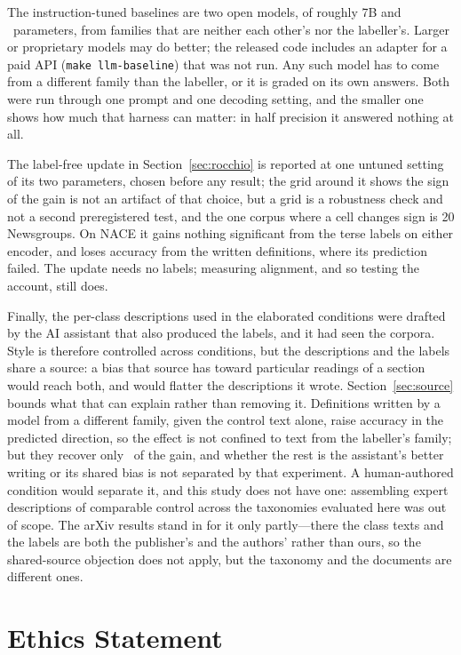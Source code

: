 \documentclass[11pt]{article}
\begin{document}
The instruction-tuned baselines are two open models, of roughly 7B and
\LLMTwoParams\ parameters, from families that are neither each other's nor the
labeller's. Larger or proprietary models may do better; the released code
includes an adapter for a paid API (\texttt{make llm-baseline}) that was not
run. Any such model has to come from a different family than the labeller, or it
is graded on its own answers. Both were run through one prompt and one decoding
setting, and the smaller one shows how much that harness can matter: in half
precision it answered nothing at all.

The label-free update in Section~\ref{sec:rocchio} is reported at one untuned
setting of its two parameters, chosen before any result; the grid around it
shows the sign of the gain is not an artifact of that choice, but a grid is a
robustness check and not a second preregistered test, and the one corpus where a
cell changes sign is 20 Newsgroups. On NACE it gains nothing significant from the terse labels
on either encoder, and loses accuracy from the written definitions, where its
prediction failed.
The update needs no labels; measuring alignment, and so testing the account, still does.

Finally, the per-class descriptions used in the elaborated conditions were
drafted by the AI assistant that also produced the labels, and it had seen the
corpora. Style is therefore controlled across conditions, but the descriptions
and the labels share a source: a bias that source has toward particular
readings of a section would reach both, and would flatter the descriptions it
wrote. Section~\ref{sec:source} bounds what that can explain rather than
removing it. Definitions written by a model from a different family, given the
control text alone, raise accuracy in the predicted direction, so the effect is
not confined to text from the labeller's family; but they recover only
\SourceWriterShare\ of the gain, and whether the rest is the assistant's
better writing or its shared bias is not separated by that experiment. A
human-authored condition would separate it, and this study does not have one:
assembling expert descriptions of comparable control across the taxonomies
evaluated here was out of scope. The arXiv results stand in for it only
partly---there the class texts and the labels are both the publisher's and the
authors' rather than ours, so the shared-source objection does not apply, but
the taxonomy and the documents are different ones.

\section*{Ethics Statement}
\end{document}

